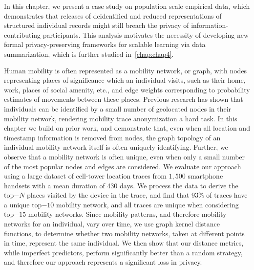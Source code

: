 In this chapter, we present a case study on population scale empirical data, which demonstrates that releases of deidentified and reduced representations of structured individual records might still breach the privacy of information-contributing participants. This analysis motivates the necessity of developing new formal privacy-preserving frameworks for scalable learning via data summarization, which is further studied in~\cref{chap:chap4}.

{Human mobility is often represented as a mobility network, or graph, with nodes representing places of significance which an individual visits, such as their home, work, places of social amenity, etc., and edge weights corresponding to probability estimates of movements between these places.
Previous research has shown that individuals can be identified by a small number of geolocated nodes in their mobility network, rendering mobility trace anonymization a hard task.
In this chapter we build on prior work, and demonstrate that, even when all location and timestamp information is removed from nodes, the graph topology of an individual mobility network itself is often uniquely identifying. 
Further, we observe that a mobility network is often unique, even when only a small number of the most popular nodes and edges are considered. 
We evaluate our approach using a large dataset of cell-tower location traces from $1,500$ smartphone handsets with a mean duration of 430 days.
We process the data to derive the top$-N$ places visited by the device in the trace, and find that $93\%$ of traces have a unique top$-10$ mobility network, and all traces are unique when considering top$-15$ mobility networks.
Since mobility patterns, and therefore mobility networks for an individual, vary over time, we use graph kernel distance functions, to determine whether two mobility networks, taken at different points in time, represent the same individual.
We then show that our distance metrics, while imperfect predictors, perform significantly better than a random strategy, and therefore our approach represents a significant loss in privacy.}

